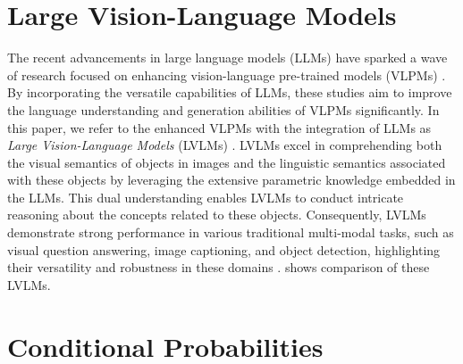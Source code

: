 \clearpage
\appendix



\section{Large Vision-Language Models}
\label{apx:lvlms}

The recent advancements in large language models (LLMs) \cite{Achiam2023GPT4TR,Touvron2023LLaMAOA, Touvron2023Llama2O,Vicuna,Bai2023QwenVLAV} have sparked a wave of research focused on enhancing vision-language pre-trained models (VLPMs) \cite{Kim2021ViLTVT, Alayrac2022FlamingoAV, Li2023BLIP2BL}. 
By incorporating the versatile capabilities of LLMs, these studies aim to improve the language understanding and generation abilities of VLPMs significantly. In this paper, we refer to the enhanced VLPMs with the integration of LLMs as \textit{Large Vision-Language Models} (LVLMs) \cite{li-etal-2023-evaluating}. LVLMs excel in comprehending both the visual semantics of objects in images and the linguistic semantics associated with these objects by leveraging the extensive parametric knowledge embedded in the LLMs. This dual understanding enables LVLMs to conduct intricate reasoning about the concepts related to these objects. Consequently, LVLMs demonstrate strong performance in various traditional multi-modal tasks, such as visual question answering, image captioning, and object detection, highlighting their versatility and robustness in these domains \cite{liu2023llava, zhu2023minigpt, ye2023mplugowl,instructblip, liu2023improvedllava, hu2023bliva, Achiam2023GPT4TR, huang2023lvlms, huang2024pixels}.  shows comparison of these LVLMs.

\section{Conditional Probabilities}
\label{apx:cond_prob}


